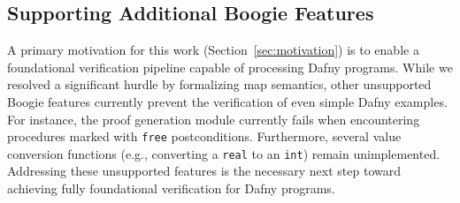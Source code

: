 \subsection{Supporting Additional Boogie Features}

A primary motivation for this work (Section~\ref{sec:motivation}) is to enable a foundational verification pipeline capable of processing Dafny programs.
While we resolved a significant hurdle by formalizing map semantics, other unsupported Boogie features currently prevent the verification of even simple Dafny examples.
For instance, the proof generation module currently fails when encountering procedures marked with \lstinline[columns=fixed]{free} postconditions.
Furthermore, several value conversion functions (e.g., converting a \lstinline[columns=fixed]{real} to an \lstinline[columns=fixed]{int}) remain unimplemented.
Addressing these unsupported features is the necessary next step toward achieving fully foundational verification for Dafny programs.

